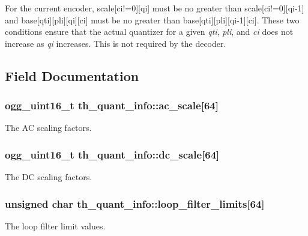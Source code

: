 For the current encoder, {\ttfamily scale[ci!=0][qi]} must be no greater than {\ttfamily scale[ci!=0][qi-\/1]} and {\ttfamily base[qti][pli][qi][ci]} must be no greater than {\ttfamily base[qti][pli][qi-\/1][ci]}. These two conditions ensure that the actual quantizer for a given {\itshape qti\/}, {\itshape pli\/}, and {\itshape ci\/} does not increase as {\itshape qi\/} increases. This is not required by the decoder. 

\subsection{Field Documentation}
\subsubsection[{ac\_\-scale}]{\setlength{\rightskip}{0pt plus 5cm}ogg\_\-uint16\_\-t {\bf th\_\-quant\_\-info::ac\_\-scale}[64]}\label{structth__quant__info_a102f079c8f4a135dc0895c10768aeb06}


The AC scaling factors. 

\subsubsection[{dc\_\-scale}]{\setlength{\rightskip}{0pt plus 5cm}ogg\_\-uint16\_\-t {\bf th\_\-quant\_\-info::dc\_\-scale}[64]}\label{structth__quant__info_ad5c1c0d1aa4127fcf864ae747d732ed9}


The DC scaling factors. 

\subsubsection[{loop\_\-filter\_\-limits}]{\setlength{\rightskip}{0pt plus 5cm}unsigned char {\bf th\_\-quant\_\-info::loop\_\-filter\_\-limits}[64]}\label{structth__quant__info_a4ac56bf0a45b5743b36daf85d5cd9e33}


The loop filter limit values. 

